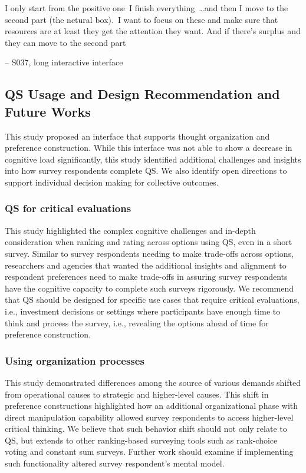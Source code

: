 \begin{displayquote}
I only start from the positive one~\bracketellipsis I finish everything~\ldots and then I move to the second part (the netural box).~\bracketellipsis I want to focus on these and make sure that resources are at least they get the attention they want. And if there's surplus and they can move to the second part

\noindent \hfill -- S037, long interactive interface
\end{displayquote}

\subsection{QS Usage and Design Recommendation and Future Works}
This study proposed an interface that supports thought organization and preference construction. While this interface was not able to show a decrease in cognitive load significantly, this study identified additional challenges and insights into how survey respondents complete QS. We also identify open directions to support individual decision making for collective outcomes.

\subsubsection{QS for critical evaluations}
This study highlighted the complex cognitive challenges and in-depth consideration when ranking and rating across options using QS, even in a short survey. Similar to survey respondents needing to make trade-offs across options, researchers and agencies that wanted the additional insights and alignment to respondent preferences need to make trade-offs in assuring survey respondents have the cognitive capacity to complete such surveys rigorously. We recommend that QS should be designed for specific use cases that require critical evaluations, i.e., investment decisions or settings where participants have enough time to think and process the survey, i.e., revealing the options ahead of time for preference construction.

\subsubsection{Using organization processes}
This study demonstrated differences among the source of various demands shifted from operational causes to strategic and higher-level causes. This shift in preference constructions highlighted how an additional organizational phase with direct manipulation capability allowed survey respondents to access higher-level critical thinking. We believe that such behavior shift should not only relate to QS, but extends to other ranking-based surveying tools such as rank-choice voting and constant sum surveys. Further work should examine if implementing such functionality altered survey respondent's mental model.

